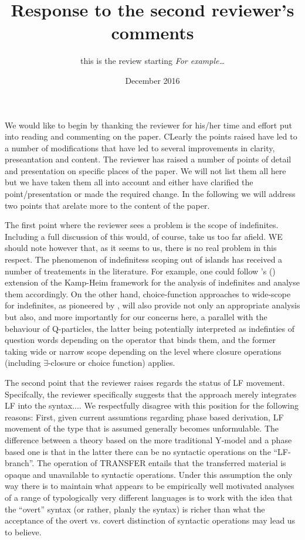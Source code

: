 \documentclass[11pt]{article}
\newcommand{\citeposs}[1]{\citeauthor{#1}'s (\citeyear{#1})}
\begin{document}
\title{Response to the second reviewer's comments}
\author{this is the review starting \textit{For example\ldots}}
\date{December 2016}

\maketitle
We would like to begin by thanking the reviewer for his/her time and effort put into reading and commenting on the paper.  CLearly the points raised have led to a number of modifications that have led to several improvements in clarity, preseantation and content.  The reviewer has raised a number of points of detail and presentation on specific places of the paper.  We will not list them all here but we have taken them all into account and either have clarified the point/presentation or made the required change.  In the following we will address two points that arelate more to the content of the paper.



The first point where the reviewer sees a problem is the scope of indefinites.  Including a full discussion of this would, of course, take us too far afield.  WE should note however that, as it seems to us,  there is no real problem in this respect.  The phenomenon of indefinitess scoping out of islands has received a number of treatements in the literature.  For example, one could follow \citeposs{abusch:1994a} extension of the Kamp-Heim framework for the analysis of indefinites and analyse them accordingly.  On the other hand, choice-function approaches to wide-scope for indefinites, as pioneered by \citet{reinhart:1997}, \citet{winter:1997a} will also provide not only an appropriate analysis but also, and more importantly for our concerns here, a parallel with the behaviour of Q-particles, the latter being potentially interpreted as indefinties of question words depending on the operator that binds them, and the former taking wide or narrow scope depending on the level where closure operations (including $\exists$-closure or choice function) applies.


The second point that the reviewer raises regards the status of LF movement.  Specifcally, the reviewer specifically suggests that the approach merely integrates LF into the syntax....
We respectfully disagree with this position for the following reasons:  First, given current assumtions regarding phase based derivation, LF movement of the type that is assumed generally becomes unformulable.  The difference between a theory based on the more traditional Y-model and a phase based one is that in the latter there can be no syntactic operations on the ``LF-branch''.  The operation of TRANSFER entails that the transferred material is opaque and unavailable to syntactic operations.  Under this assumption the only way there is to maintain what appears to be empirically well motivated analyses of a range of typologically very different languages is to work with the idea that the ``overt'' syntax (or rather, planly the syntax) is richer than what the acceptance of the overt vs. covert distinction of syntactic operations may lead us to believe.



\end{document}
